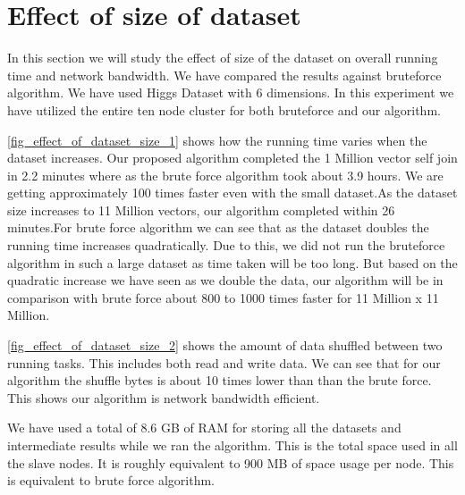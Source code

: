 \section{Effect of size of dataset}

In this section we will study the effect of size of the dataset on overall running
time and network bandwidth. We have compared the results against bruteforce algorithm.
We have used Higgs Dataset with 6 dimensions. In this experiment we
have utilized the entire ten node cluster for both bruteforce and our
algorithm.

\cref{fig_effect_of_dataset_size_1} shows how
the running time varies when the dataset increases.
Our proposed algorithm completed the 1 Million vector self join
in 2.2 minutes where as the brute force algorithm took about 3.9
hours. We are getting approximately 100 times faster even with the small
dataset.As the dataset size increases to 11 Million vectors, our
algorithm completed within 26 minutes.For brute force algorithm we can see that as the dataset doubles the running time
increases quadratically.  Due to this, we did not run the bruteforce
algorithm in such a large dataset as time taken will be too long. But
based on the quadratic increase we have seen as we double the data, our algorithm will be in comparison with
brute force about 800 to 1000 times faster for 11 Million x 11 Million.

\cref{fig_effect_of_dataset_size_2} shows the amount of data
shuffled between two running tasks. This includes both read and
write data. We can see that for our algorithm the shuffle bytes is
about 10 times lower than than the brute force. This shows our
algorithm is network bandwidth efficient.

We have used a total of 8.6 GB of RAM for storing all the datasets and
intermediate results while we ran the
algorithm. This is the total space used in all the slave nodes. It is
roughly equivalent to 900 MB of space usage per node. This is
equivalent to brute force algorithm.

